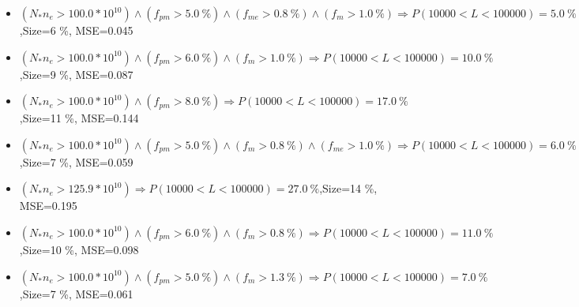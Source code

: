 \documentclass[numbered]{CSL}
\begin{document}
\begin{itemize}
\item $(N_* n_e > 100.0 * 10^{10}) \land (f_{pm} > 5.0~\%) \land (f_{me} > 0.8~\%) \land (f_m > 1.0~\%) \Rightarrow P(10 000 < L < 100 000) = 5.0~\%$,\hfill Size=6 \%, MSE=0.045
\item $(N_* n_e > 100.0 * 10^{10}) \land (f_{pm} > 6.0~\%) \land (f_m > 1.0~\%) \Rightarrow P(10 000 < L < 100 000) = 10.0~\%$,\hfill Size=9 \%, MSE=0.087
\item $(N_* n_e > 100.0 * 10^{10}) \land (f_{pm} > 8.0~\%) \Rightarrow P(10 000 < L < 100 000) = 17.0~\%$,\hfill Size=11 \%, MSE=0.144
\item $(N_* n_e > 100.0 * 10^{10}) \land (f_{pm} > 5.0~\%) \land (f_m > 0.8~\%) \land (f_{me} > 1.0~\%) \Rightarrow P(10 000 < L < 100 000) = 6.0~\%$,\hfill Size=7 \%, MSE=0.059
\item $(N_* n_e > 125.9 * 10^{10}) \Rightarrow P(10 000 < L < 100 000) = 27.0~\%$,\hfill Size=14 \%, MSE=0.195
\item $(N_* n_e > 100.0 * 10^{10}) \land (f_{pm} > 6.0~\%) \land (f_m > 0.8~\%) \Rightarrow P(10 000 < L < 100 000) = 11.0~\%$,\hfill Size=10 \%, MSE=0.098
\item $(N_* n_e > 100.0 * 10^{10}) \land (f_{pm} > 5.0~\%) \land (f_m > 1.3~\%) \Rightarrow P(10 000 < L < 100 000) = 7.0~\%$,\hfill Size=7 \%, MSE=0.061
\end{itemize}
\end{document}
